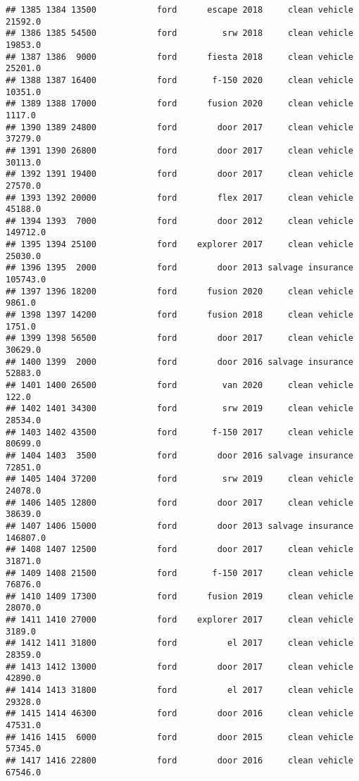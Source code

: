 \documentclass[
]{article}
\begin{document}
\begin{verbatim}
## 1385 1384 13500            ford      escape 2018     clean vehicle   21592.0
## 1386 1385 54500            ford         srw 2018     clean vehicle   19853.0
## 1387 1386  9000            ford      fiesta 2018     clean vehicle   25201.0
## 1388 1387 16400            ford       f-150 2020     clean vehicle   10351.0
## 1389 1388 17000            ford      fusion 2020     clean vehicle    1117.0
## 1390 1389 24800            ford        door 2017     clean vehicle   37279.0
## 1391 1390 26800            ford        door 2017     clean vehicle   30113.0
## 1392 1391 19400            ford        door 2017     clean vehicle   27570.0
## 1393 1392 20000            ford        flex 2017     clean vehicle   45188.0
## 1394 1393  7000            ford        door 2012     clean vehicle  149712.0
## 1395 1394 25100            ford    explorer 2017     clean vehicle   25030.0
## 1396 1395  2000            ford        door 2013 salvage insurance  105743.0
## 1397 1396 18200            ford      fusion 2020     clean vehicle    9861.0
## 1398 1397 14200            ford      fusion 2018     clean vehicle    1751.0
## 1399 1398 56500            ford        door 2017     clean vehicle   30629.0
## 1400 1399  2000            ford        door 2016 salvage insurance   52883.0
## 1401 1400 26500            ford         van 2020     clean vehicle     122.0
## 1402 1401 34300            ford         srw 2019     clean vehicle   28534.0
## 1403 1402 43500            ford       f-150 2017     clean vehicle   80699.0
## 1404 1403  3500            ford        door 2016 salvage insurance   72851.0
## 1405 1404 37200            ford         srw 2019     clean vehicle   24078.0
## 1406 1405 12800            ford        door 2017     clean vehicle   38639.0
## 1407 1406 15000            ford        door 2013 salvage insurance  146807.0
## 1408 1407 12500            ford        door 2017     clean vehicle   31871.0
## 1409 1408 21500            ford       f-150 2017     clean vehicle   76876.0
## 1410 1409 17300            ford      fusion 2019     clean vehicle   28070.0
## 1411 1410 27000            ford    explorer 2017     clean vehicle    3189.0
## 1412 1411 31800            ford          el 2017     clean vehicle   28359.0
## 1413 1412 13000            ford        door 2017     clean vehicle   42890.0
## 1414 1413 31800            ford          el 2017     clean vehicle   29328.0
## 1415 1414 46300            ford        door 2016     clean vehicle   47531.0
## 1416 1415  6000            ford        door 2015     clean vehicle   57345.0
## 1417 1416 22800            ford        door 2016     clean vehicle   67546.0

\end{verbatim}
\end{document}
